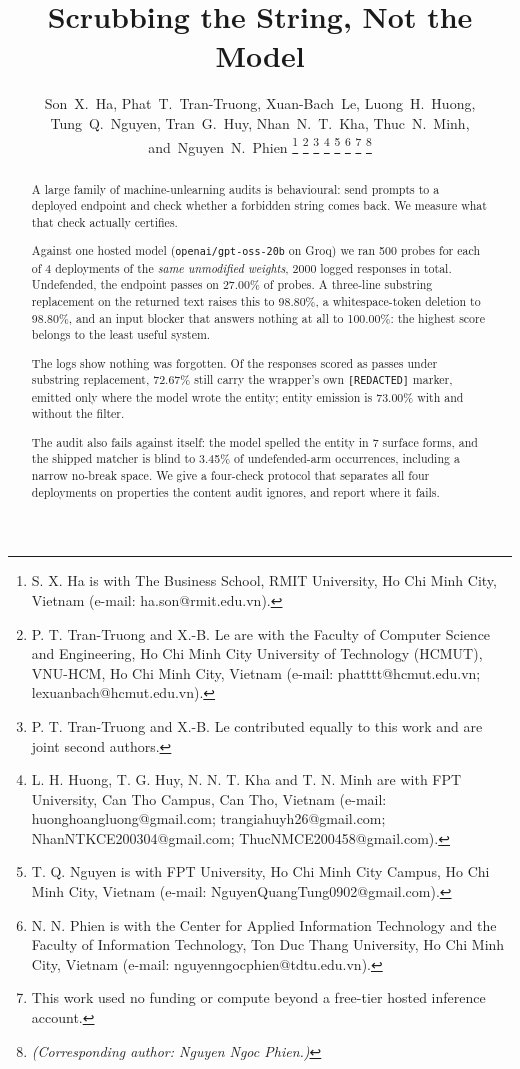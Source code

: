 \documentclass[journal]{IEEEtran}
\theoremstyle{definition}
\newcommand{\Nrows}{2000}
\newcommand{\Nper}{500}
\newcommand{\Nstrat}{4}
\newcommand{\Model}{\texttt{openai/\allowbreak{}gpt-\allowbreak{}oss-\allowbreak{}20b}}
\newcommand{\Provider}{Groq}
\newcommand{\NoneRate}{27.00}
\newcommand{\PfRate}{100.00}
\newcommand{\OfRate}{98.80}
\newcommand{\SenRate}{98.80}
\newcommand{\VarBlindNonePc}{3.45}
\newcommand{\Nvariants}{7}
\newcommand{\EmitRate}{73.00}
\newcommand{\RedactPassingPc}{72.67}
\begin{document}
\title{Scrubbing the String, Not the Model}

\author{%
  Son~X.~Ha,
  Phat~T.~Tran-Truong,
  Xuan-Bach~Le,
  Luong~H.~Huong,
  Tung~Q.~Nguyen,
  Tran~G.~Huy,
  Nhan~N.~T.~Kha,
  Thuc~N.~Minh,
  and~Nguyen~N.~Phien%
  \thanks{S. X. Ha is with The Business School, RMIT University,
    Ho Chi Minh City, Vietnam (e-mail: ha.son@rmit.edu.vn).}%
  \thanks{P. T. Tran-Truong and X.-B. Le are with the Faculty of Computer
    Science and Engineering, Ho Chi Minh City University of Technology (HCMUT),
    VNU-HCM, Ho Chi Minh City, Vietnam
    (e-mail: phatttt@hcmut.edu.vn; lexuanbach@hcmut.edu.vn).}%
  \thanks{P. T. Tran-Truong and X.-B. Le contributed equally to this work
    and are joint second authors.}%
  \thanks{L. H. Huong, T. G. Huy, N. N. T. Kha and T. N. Minh are with
    FPT University, Can Tho Campus, Can Tho, Vietnam
    (e-mail: huonghoangluong@gmail.com; trangiahuyh26@gmail.com;
    NhanNTKCE200304@gmail.com; ThucNMCE200458@gmail.com).}%
  \thanks{T. Q. Nguyen is with FPT University, Ho Chi Minh City Campus,
    Ho Chi Minh City, Vietnam (e-mail: NguyenQuangTung0902@gmail.com).}%
  \thanks{N. N. Phien is with the Center for Applied Information
    Technology and the Faculty of Information Technology, Ton Duc Thang
    University, Ho Chi Minh City, Vietnam
    (e-mail: nguyenngocphien@tdtu.edu.vn).}%
  \thanks{This work used no funding or compute beyond a free-tier hosted inference account.}%
  \thanks{\emph{(Corresponding author: Nguyen Ngoc Phien.)}}%
}

\maketitle

\begin{abstract}
A large family of machine-unlearning audits is behavioural: send prompts to a
deployed endpoint and check whether a forbidden string comes back. We measure
what that check actually certifies.

Against one hosted model (\Model{} on \Provider{}) we ran \Nper{} probes for
each of \Nstrat{} deployments of the \emph{same unmodified weights},
\Nrows{} logged responses in total. Undefended, the endpoint passes on
\NoneRate\% of probes. A three-line substring replacement on the returned text
raises this to \OfRate\%, a whitespace-token deletion to \SenRate\%, and an
input blocker that answers nothing at all to \PfRate\%: the highest score
belongs to the least useful system.

The logs show nothing was forgotten. Of the responses scored as passes under
substring replacement, \RedactPassingPc\% still carry the wrapper's own
\texttt{[REDACTED]} marker, emitted only where the model wrote the entity;
entity emission is \EmitRate\% with and without the filter.

The audit also fails against itself: the model spelled the entity in
\Nvariants{} surface forms, and the shipped matcher is blind to
\VarBlindNonePc\% of undefended-arm occurrences, including a narrow no-break
space. We give a four-check protocol that separates all four deployments on
properties the content audit ignores, and report where it fails.
\end{abstract}
\end{document}
